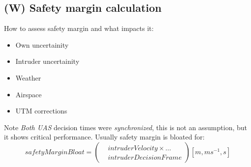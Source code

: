 \subsection{(W) Safety margin calculation}\label{s:safetyMarginCalculation}
    How to assess safety margin and what impacts it:
    \begin{itemize}
        \item Own uncertainity 
        \item Intruder uncertainity 
        \item Weather
        \item Airspace
        \item UTM corrections
    \end{itemize}
    
    Note \emph{Both UAS} decision times were \emph{synchronized}, this is not an assumption, but it shows critical performance. Usually safety margin is bloated for:
            \begin{equation}\label{safetyMarginBloat}
                safetyMarginBloat = \left( \begin{aligned}
                &intruderVelocity \times\dots \\ &intruderDecisionFrame \end{aligned}\right)[m,ms^{-1},s]
            \end{equation}
